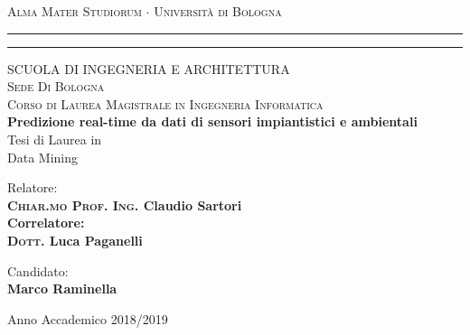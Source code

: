 \begin{titlepage}
\begin{center}
\Large
{
	\textsc
	{
		Alma Mater Studiorum $\cdot$ Università di Bologna
	}
} 
\rule[0.1cm]{15.8cm}{0.1mm}
\rule[0.5cm]{15.8cm}{0.6mm}
\small
\textsc 
{ 
	SCUOLA DI INGEGNERIA E ARCHITETTURA \\
	Sede Di Bologna\\
	Corso di Laurea Magistrale in Ingegneria Informatica\\
}
\vspace{15mm}
\LARGE\textbf
{
	Predizione real-time da dati di sensori impiantistici e ambientali\\
}
\vspace{15mm}
{\large{\sc Tesi di Laurea in 
\\ Data Mining}}
\end{center}
\vspace{15mm}
\par
\noindent
\begin{minipage}[t]{0.60\textwidth}
\large{\sc Relatore:}\\
\bf \textsc{Chiar.mo Prof. Ing.} Claudio Sartori\\ 
\vskip 8pt
\large{\sc Correlatore:}\\
\bf \textsc{Dott.} Luca Paganelli
\end{minipage}
\begin{minipage}[t]{0.40\textwidth}\raggedleft
{\large{\sc Candidato:}\\
\vspace{1.5mm}
{\bf Marco Raminella}}
\end{minipage}
\vspace{15mm}
\begin{center}
\large{\sc Anno Accademico 2018/2019}
\end{center}
\end{titlepage}